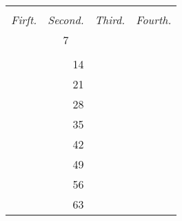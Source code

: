 \documentclass[12pt,preview]{standalone}
\begin{document}
\begin{center}
    \begin{tabular}{ |c|c|c|c| }
        \hline
        \hfill                                    & \hfill                     & \hfill                                     & \hfill                                       \\
        \textit{Firſt.}                           & \textit{Second.}           & \textit{Third.}                            & \textit{Fourth.}                             \\
        {\color{cred}{8}}                         & 7                          & {\color{cblue}{10}}                        & {\color{cyellow}{9}}                         \\
        \hfill                                    & \hfill                     & \hfill                                     & \hfill                                       \\
        \hline
        \multicolumn{1}{|r|}{{\color{cred}{16}}}  & \multicolumn{1}{|r|}{14}   & \multicolumn{1}{|r|}{{\color{cblue}{20}}}  & \multicolumn{1}{|r|}{{\color{cyellow}{18}}}  \\
        \multicolumn{1}{|r|}{{\color{cred}{24}}}  & \multicolumn{1}{|r|}{21}   & \multicolumn{1}{|r|}{{\color{cblue}{30}}}  & \multicolumn{1}{|r|}{{\color{cyellow}{27}}}  \\
        \multicolumn{1}{|r|}{{\color{cred}{32}}}  & \multicolumn{1}{|r|}{28}   & \multicolumn{1}{|r|}{{\color{cblue}{40}}}  & \multicolumn{1}{|r|}{{\color{cyellow}{36}}}  \\
        \multicolumn{1}{|r|}{{\color{cred}{40}}}  & \multicolumn{1}{|r|}{35}   & \multicolumn{1}{|r|}{{\color{cblue}{50}}}  & \multicolumn{1}{|r|}{{\color{cyellow}{45}}}  \\
        \multicolumn{1}{|r|}{{\color{cred}{48}}}  & \multicolumn{1}{|r|}{42}   & \multicolumn{1}{|r|}{{\color{cblue}{60}}}  & \multicolumn{1}{|r|}{{\color{cyellow}{54}}}  \\
        \multicolumn{1}{|r|}{{\color{cred}{56}}}  & \multicolumn{1}{|r|}{49}   & \multicolumn{1}{|r|}{{\color{cblue}{70}}}  & \multicolumn{1}{|r|}{{\color{cyellow}{63}}}  \\
        \multicolumn{1}{|r|}{{\color{cred}{64}}}  & \multicolumn{1}{|r|}{56}   & \multicolumn{1}{|r|}{{\color{cblue}{80}}}  & \multicolumn{1}{|r|}{{\color{cyellow}{72}}}  \\
        \multicolumn{1}{|r|}{{\color{cred}{72}}}  & \multicolumn{1}{|r|}{63}   & \multicolumn{1}{|r|}{{\color{cblue}{90}}}  & \multicolumn{1}{|r|}{{\color{cyellow}{81}}}  \\

\end{tabular}
\end{center}
\end{document}
